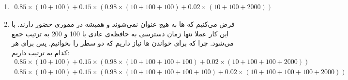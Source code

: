\begin{enumerate}
    \item \begin{gather*}
        0.85 \times (10 + 100) + 0.15 \times (0.98 \times (10 + 100 + 100) + 0.02 \times (10 + 100 + 2000))
    \end{gather*}
    \item فرض می‌کنیم که ها
    به هیچ عنوان
    نمی‌شوند و همیشه در مموری حضور دارند. با این کار عملا تنها زمان دسترسی به حافظه‌ی عادی با 100 و 200 به ترتیب جمع می‌شود.
    چرا که برای خواندن
    ها
    نیاز داریم که دو سطر
    را بخوانیم. پس برای هر کدام به ترتیب داریم:
    \begin{gather*}
        0.85 \times (10 + 100) + 0.15 \times (0.98 \times (10 + 100 + 100 + 100) + 0.02 \times (10 + 100 + 100 + 2000))\\
        0.85 \times (10 + 100) + 0.15 \times (0.98 \times (10 + 100 + 100 + 100 + 100) + 0.02 \times (10 + 100 + 100 + 100 + 2000))
    \end{gather*}
\end{enumerate}

